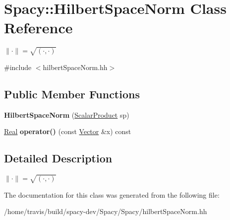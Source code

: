 \hypertarget{classSpacy_1_1HilbertSpaceNorm}{\section{Spacy\-:\-:Hilbert\-Space\-Norm Class Reference}
\label{classSpacy_1_1HilbertSpaceNorm}
}


$ \|\cdot\|=\sqrt{(\cdot,\cdot)} $  




{\ttfamily \#include $<$hilbert\-Space\-Norm.\-hh$>$}

\subsection*{Public Member Functions}
\begin{DoxyCompactItemize}
\item 
\hypertarget{classSpacy_1_1HilbertSpaceNorm_aba5acc55249256d58fbba34911446ca2}{{\bfseries Hilbert\-Space\-Norm} (\hyperlink{namespaceSpacy_aa995526aa0e3fa58aca8dd6772311cad}{Scalar\-Product} sp)}\label{classSpacy_1_1HilbertSpaceNorm_aba5acc55249256d58fbba34911446ca2}

\item 
\hypertarget{classSpacy_1_1HilbertSpaceNorm_a042d8b6148297e16c0244e50799967c5}{\hyperlink{classSpacy_1_1Real}{Real} {\bfseries operator()} (const \hyperlink{classSpacy_1_1Vector}{Vector} \&x) const }\label{classSpacy_1_1HilbertSpaceNorm_a042d8b6148297e16c0244e50799967c5}

\end{DoxyCompactItemize}


\subsection{Detailed Description}
$ \|\cdot\|=\sqrt{(\cdot,\cdot)} $ 

The documentation for this class was generated from the following file\-:\begin{DoxyCompactItemize}
\item 
/home/travis/build/spacy-\/dev/\-Spacy/\-Spacy/hilbert\-Space\-Norm.\-hh\end{DoxyCompactItemize}
